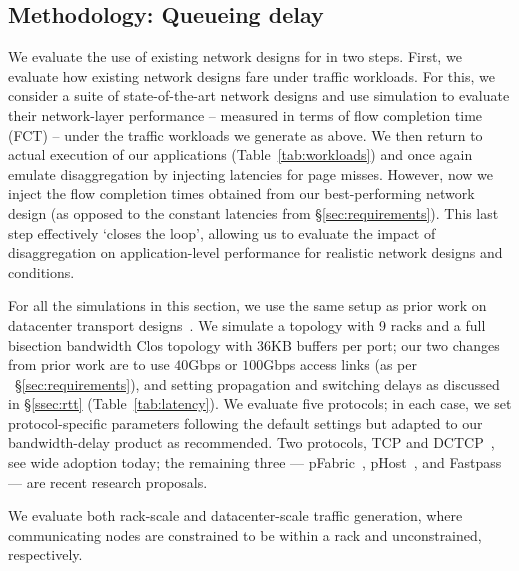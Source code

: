 \vspace{-0.1in}
\subsection{Methodology: Queueing delay}
\label{ssec:ssmethod}
\vspace{-0.05in}
We evaluate the use of existing network designs for \dis in two steps.
First, we evaluate how existing network designs fare under \dis traffic workloads. 
For this, we consider a suite of state-of-the-art network designs and use simulation to evaluate their network-layer performance -- measured in terms of flow completion time (FCT) -- under the traffic workloads we generate as above.
We then return to actual execution of our applications (Table~\ref{tab:workloads}) and once again emulate disaggregation by injecting latencies for page misses. 
However, now we inject the flow completion times obtained from our best-performing network design (as opposed to the constant latencies from \S\ref{sec:requirements}). This last step effectively `closes the loop', allowing us to evaluate the impact of disaggregation on application-level performance for realistic network designs and conditions. 

For all the simulations in this section, we use the same setup as prior work on datacenter transport designs~\cite{pfabric, phost}. 
We simulate a %
topology with 9 racks and a full bisection bandwidth Clos topology with $36$KB buffers per port; our two changes from prior work are to use $40$Gbps or $100$Gbps access links (as per ~\S\ref{sec:requirements}), and setting propagation and switching delays as discussed in \S\ref{ssec:rtt} (Table~\ref{tab:latency}).
We evaluate five protocols; in each case, we set protocol-specific parameters following the default settings but adapted to our bandwidth-delay product as recommended. Two protocols, TCP and DCTCP~\cite{dctcp}, see wide adoption today; the remaining three --- pFabric~\cite{pfabric}, pHost~\cite{phost}, and Fastpass~\cite{fastpass} --- are recent research proposals.

We evaluate both rack-scale and datacenter-scale traffic generation, where communicating nodes are constrained to be within a rack and unconstrained, respectively.

